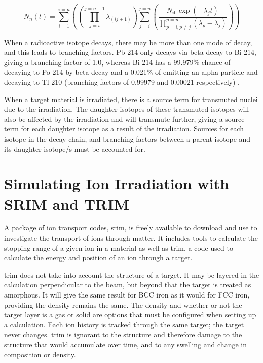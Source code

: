 \begin{equation}
N_{n}(t) = \sum_{i=1}^{i=n} \left( \left( \prod_{j=i}^{j=n-1} \lambda_{(ij+1)}\right) \sum_{j=i}^{j=n} \left(\frac{N_{i0}\exp(-\lambda_{j}t)}{\prod_{p=i,p\neq j}^{p=n} (\lambda_{p} - \lambda_{j})}\right)\right)
\label{eq:bateman}
\end{equation}

When a radioactive isotope decays, there may be more than one mode of decay, and this leads to branching factors.  Pb-214 only decays via beta decay to Bi-214, giving a branching factor of 1.0, whereas Bi-214 has a 99.979\% chance of decaying to Po-214 by beta decay and a 0.021\% of emitting an alpha particle and decaying to Tl-210 (branching factors of 0.99979 and 0.00021 respectively) \cite{jeff311}.

When a target material is irradiated, there is a source term for transmuted nuclei due to the irradiation.  The daughter isotopes of these transmuted isotopes will also be affected by the irradiation and will transmute further, giving a source term for each daughter isotope as a result of the irradiation.  Sources for each isotope in the decay chain, and branching factors between a parent isotope and its daughter isotope/s must be accounted for.













\section[Using SRIM and TRIM]{Simulating Ion Irradiation with SRIM and TRIM}
\label{section:srimtrim}

A package of ion transport codes, \acrshort{srim}, is freely available to download and use to investigate the transport of ions through matter.  It includes tools to calculate the stopping range of a given ion in a material as well as \acrlong{trim}, a code used to calculate the energy and position of an ion through a target.

\acrshort{trim} does not take into account the structure of a target.  It may be layered in the calculation perpendicular to the beam, but beyond that the target is treated as amorphous.  It will give the same result for BCC iron as it would for FCC iron, providing the density remains the same.  The density and whether or not the target layer is a gas or solid are options that must be configured when setting up a calculation.  Each ion history is tracked through the same target; the target never changes.  \acrshort{trim} is ignorant to the structure and therefore damage to the structure that would accumulate over time, and to any swelling and change in composition or density.

